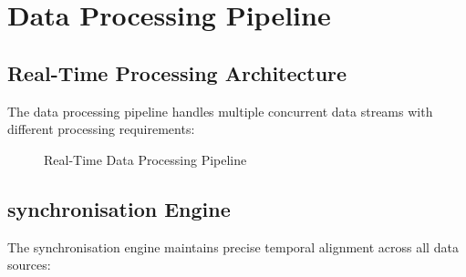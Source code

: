 \documentclass[11pt,a4paper]{report}
\begin{document}
\section{Data Processing Pipeline}

\subsection{Real-Time Processing Architecture}

The data processing pipeline handles multiple concurrent data streams with different processing requirements:

\begin{figure}[ht]
\centering
\framebox[0.9\textwidth][c]{\rule{0pt}{4cm}}
\caption{Real-Time Data Processing Pipeline}
\label{fig:data-pipeline}
\end{figure}

\subsection{synchronisation Engine}

The synchronisation engine maintains precise temporal alignment across all data sources:
\end{document}
